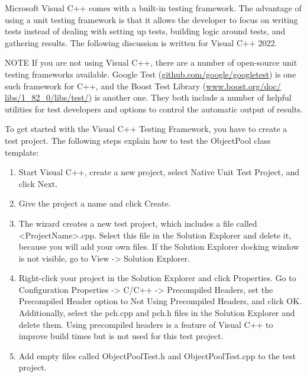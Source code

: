 
Microsoft Visual C++ comes with a built-in testing framework. The advantage of using a unit testing framework is that it allows the developer to focus on writing tests instead of dealing with setting up tests, building logic around tests, and gathering results. The following discussion is written for Visual C++ 2022.

\begin{myNotic}{NOTE}
If you are not using Visual C++, there are a number of open-source unit testing frameworks available. Google Test (\url{github.com/google/googletest}) is one such framework for C++, and the Boost Test Library (\url{www.boost.org/doc/ libs/1_82_0/libs/test/}) is another one. They both include a number of helpful utilities for test developers and options to control the automatic output of results.
\end{myNotic}

To get started with the Visual C++ Testing Framework, you have to create a test project. The following steps explain how to test the ObjectPool class template:

\begin{enumerate}
\item
Start Visual C++, create a new project, select Native Unit Test Project, and click Next.

\item
Give the project a name and click Create.

\item
The wizard creates a new test project, which includes a file called <ProjectName>.cpp. Select this file in the Solution Explorer and delete it, because you will add your own files. If the Solution Explorer docking window is not visible, go to View -> Solution Explorer.

\item
Right-click your project in the Solution Explorer and click Properties. Go to Configuration Properties -> C/C++ -> Precompiled Headers, set the Precompiled Header option to Not Using Precompiled Headers, and click OK. Additionally, select the pch.cpp and pch.h files in the Solution Explorer and delete them. Using precompiled headers is a feature of Visual C++ to improve build times but is not used for this test project.

\item
Add empty files called ObjectPoolTest.h and ObjectPoolTest.cpp to the test project.
\end{enumerate}

